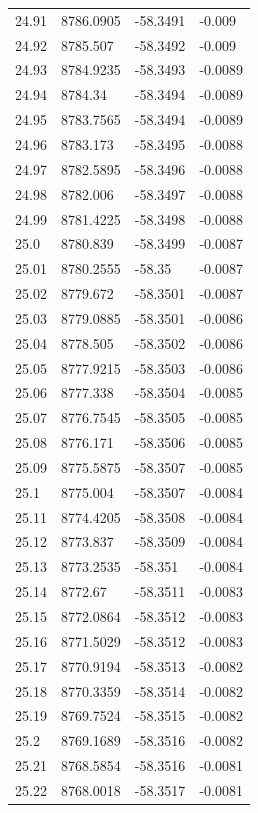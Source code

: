 \begin{table}[H]
\begin{tabular}{llll}
24.91 & 8786.0905 & -58.3491 & -0.009 \\
24.92 & 8785.507 & -58.3492 & -0.009 \\
24.93 & 8784.9235 & -58.3493 & -0.0089 \\
24.94 & 8784.34 & -58.3494 & -0.0089 \\
24.95 & 8783.7565 & -58.3494 & -0.0089 \\
24.96 & 8783.173 & -58.3495 & -0.0088 \\
24.97 & 8782.5895 & -58.3496 & -0.0088 \\
24.98 & 8782.006 & -58.3497 & -0.0088 \\
24.99 & 8781.4225 & -58.3498 & -0.0088 \\
25.0 & 8780.839 & -58.3499 & -0.0087 \\
25.01 & 8780.2555 & -58.35 & -0.0087 \\
25.02 & 8779.672 & -58.3501 & -0.0087 \\
25.03 & 8779.0885 & -58.3501 & -0.0086 \\
25.04 & 8778.505 & -58.3502 & -0.0086 \\
25.05 & 8777.9215 & -58.3503 & -0.0086 \\
25.06 & 8777.338 & -58.3504 & -0.0085 \\
25.07 & 8776.7545 & -58.3505 & -0.0085 \\
25.08 & 8776.171 & -58.3506 & -0.0085 \\
25.09 & 8775.5875 & -58.3507 & -0.0085 \\
25.1 & 8775.004 & -58.3507 & -0.0084 \\
25.11 & 8774.4205 & -58.3508 & -0.0084 \\
25.12 & 8773.837 & -58.3509 & -0.0084 \\
25.13 & 8773.2535 & -58.351 & -0.0084 \\
25.14 & 8772.67 & -58.3511 & -0.0083 \\
25.15 & 8772.0864 & -58.3512 & -0.0083 \\
25.16 & 8771.5029 & -58.3512 & -0.0083 \\
25.17 & 8770.9194 & -58.3513 & -0.0082 \\
25.18 & 8770.3359 & -58.3514 & -0.0082 \\
25.19 & 8769.7524 & -58.3515 & -0.0082 \\
25.2 & 8769.1689 & -58.3516 & -0.0082 \\
25.21 & 8768.5854 & -58.3516 & -0.0081 \\
25.22 & 8768.0018 & -58.3517 & -0.0081 \\

\end{tabular}
\end{table}
